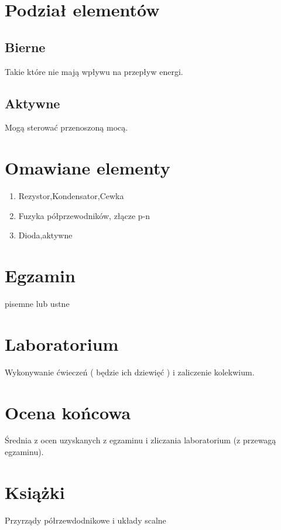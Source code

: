 \documentclass[11pt]{article}
\begin{document}
\section{Podział elementów}

\subsection{Bierne}
Takie które nie mają wpływu na przepływ energi.

\subsection{Aktywne}
Mogą sterować przenoszoną mocą.

\section{Omawiane elementy}
\begin{enumerate}
\item{Rezystor,Kondensator,Cewka}
\item{Fuzyka półprzewodników, złącze p-n}
\item{Dioda,aktywne}
\end{enumerate}

\section{Egzamin}
pisemne lub ustne
\section{Laboratorium}
Wykonywanie ćwieczeń ( będzie ich dziewięć ) i zaliczenie kolekwium.
\section{Ocena końcowa}
Średnia z ocen uzyskanych z egzaminu i zliczania laboratorium (z przewagą egzaminu).

\section{Książki}

Przyrządy półrzewdodnikowe i układy scalne
\end{document}
